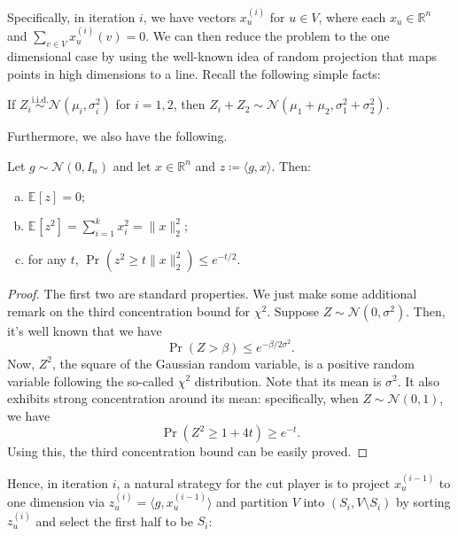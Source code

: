 Specifically, in iteration \(i\), we have vectors \(x^{(i)}_u\) for \(u \in V\), where each \(x_u \in \mathbb{R} ^n\) and \(\sum_{v \in V} x_u^{(i)}(v) = 0\). We can then reduce the problem to the one dimensional case by using the well-known idea of random projection that maps points in high dimensions to a line. Recall the following simple facts:

\begin{prev}
	If \(Z_i \overset{\text{i.i.d.} }{\sim } \mathcal{N} (\mu _i, \sigma _i^2)\) for \(i = 1, 2\), then \(Z_i + Z_2 \sim \mathcal{N} (\mu _1 + \mu _2, \sigma _1^2 + \sigma _2^2)\).
\end{prev}

Furthermore, we also have the following.

\begin{lemma}\label{lma:Gaussian-random-projection}
	Let \(g \sim \mathcal{N} (0, I_n)\) and let \(x \in \mathbb{R} ^n\) and \(z \coloneqq \langle g, x \rangle \). Then:
	\begin{enumerate}[(a)]
		\item \(\mathbb{E}_{}[z] = 0\);
		\item \(\mathbb{E}_{}[z^2] = \sum_{i=1}^{k} x_i^2 = \lVert x \rVert _2^2\);
		\item for any \(t\), \(\Pr_{}(z^2 \geq t \lVert x \rVert _2^2) \leq e^{-t / 2}\).
	\end{enumerate}
\end{lemma}
\begin{proof}
	The first two are standard properties. We just make some additional remark on the third concentration bound for \(\chi ^2\). Suppose \(Z \sim \mathcal{N} (0, \sigma ^2)\). Then, it's well known that we have
	\[
		\Pr_{}(Z > \beta ) \leq e^{- \beta / 2 \sigma ^2}.
	\]
	Now, \(Z^2\), the square of the Gaussian random variable, is a positive random variable following the so-called \(\chi ^2\) distribution. Note that its mean is \(\sigma ^2\). It also exhibits strong concentration around its mean: specifically, when \(Z \sim \mathcal{N} (0, 1)\), we have
	\[
		\Pr_{}(Z^2 \geq 1 + 4t) \geq e^{-t}.
	\]
	Using this, the third concentration bound can be easily proved.
\end{proof}

Hence, in iteration \(i\), a natural strategy for the cut player is to project \(x_u^{(i-1)}\) to one dimension via \(z_u^{(i)} = \langle g, x_u^{(i-1)} \rangle \) and partition \(V\) into \((S_i, V\setminus S_i)\) by sorting \(z_u^{(i)}\) and select the first half to be \(S_i\):


